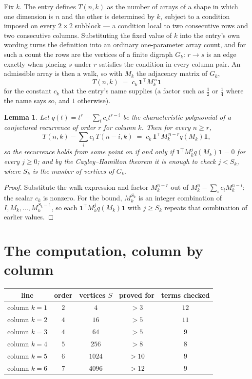 \documentclass[11pt,a4paper]{article}
\theoremstyle{plain}
\newtheorem{lemma}[theorem]{Lemma}
\theoremstyle{definition}
\begin{document}
Fix $k$. The entry defines $T(n,k)$ as the number of arrays of a shape in which one dimension
is $n$ and the other is determined by $k$, subject to a condition imposed on every
$2\times2$ subblock --- a condition local to two consecutive rows and two consecutive columns.
Substituting the fixed value of $k$ into the entry's own wording turns the definition into an
ordinary one-parameter array count, and for such a count the rows are the vertices of a finite
digraph $G_k$: $r\to s$ is an edge exactly when placing $s$ under $r$ satisfies the condition
in every column pair. An admissible array is then a walk, so with $M_k$ the adjacency matrix
of $G_k$,
\[
T(n,k)\;=\;c_k\,\mathbf{1}^{\!\top}M_k^{\,n}\mathbf{1}
\]
for the constant $c_k$ that the entry's name supplies (a factor such as $\tfrac12$ or
$\tfrac14$ where the name says so, and $1$ otherwise).

\begin{lemma}\label{lem:crit}
Let $q(t)=t^{r}-\sum_i c_it^{r-i}$ be the characteristic polynomial of a conjectured
recurrence of order $r$ for column $k$. Then for every $n\ge r$,
\[
T(n,k)-\sum_i c_i\,T(n-i,k)\;=\;c_k\,\mathbf{1}^{\!\top}M_k^{\,n-r}q(M_k)\mathbf{1},
\]
so the recurrence holds from some point on if and only if
$\mathbf{1}^{\!\top}M_k^{j}q(M_k)\mathbf{1}=0$ for every $j\ge0$; and by the
Cayley--Hamilton theorem it is enough to check $j<S_k$, where $S_k$ is the number of vertices
of $G_k$.
\end{lemma}

\begin{proof}
Substitute the walk expression and factor $M_k^{n-r}$ out of $M_k^{n}-\sum_ic_iM_k^{n-i}$;
the scalar $c_k$ is nonzero. For the bound, $M_k^{S_k}$ is an integer combination of
$I,M_k,\dots,M_k^{S_k-1}$, so each $\mathbf{1}^{\!\top}M_k^{j}q(M_k)\mathbf{1}$ with
$j\ge S_k$ repeats that combination of earlier values.
\end{proof}

\section{The computation, column by column}

\begin{center}
\begin{tabular}{ccccc}
line & order & vertices $S$ & proved for & terms checked \\ \hline
column $k$$=1$ & $2$ & $4$ & $>3$ & $12$ \\
column $k$$=2$ & $4$ & $16$ & $>5$ & $11$ \\
column $k$$=3$ & $4$ & $64$ & $>5$ & $9$ \\
column $k$$=4$ & $5$ & $256$ & $>8$ & $8$ \\
column $k$$=5$ & $6$ & $1024$ & $>10$ & $9$ \\
column $k$$=6$ & $7$ & $4096$ & $>12$ & $9$ \\
\end{tabular}
\end{center}
\end{document}
